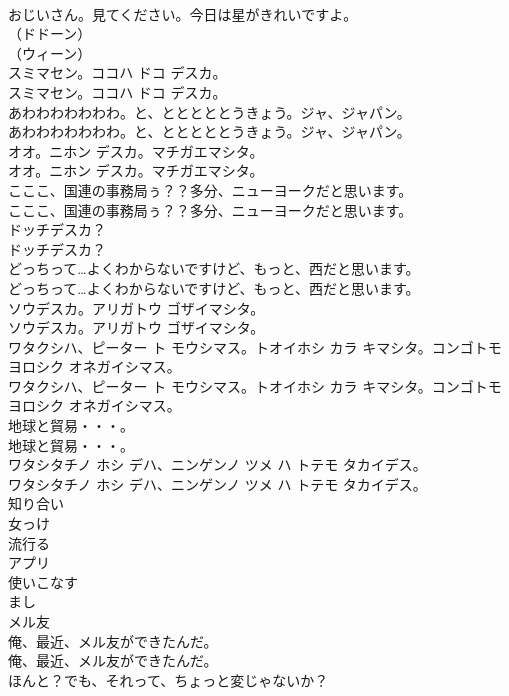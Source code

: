 \documentclass[8pt]{extreport}
\begin{document}
\begin{CJK}{UTF8}{min}
\\	おじいさん。見てください。今日は星がきれいですよ。 
\\	（ドドーン）	
\\	（ウィーン）	
\\	スミマセン。ココハ ドコ デスカ。	
\\	スミマセン。ココハ ドコ デスカ。 
\\	あわわわわわわわ。と、とととととうきょう。ジャ、ジャパン。	
\\	あわわわわわわわ。と、とととととうきょう。ジャ、ジャパン。 
\\	オオ。ニホン デスカ。マチガエマシタ。	
\\	オオ。ニホン デスカ。マチガエマシタ。 
\\	こここ、国連の事務局ぅ？？多分、ニューヨークだと思います。	
\\	こここ、国連の事務局ぅ？？多分、ニューヨークだと思います。 
\\	ドッチデスカ？	
\\	ドッチデスカ？ 
\\	どっちって…よくわからないですけど、もっと、西だと思います。	
\\	どっちって…よくわからないですけど、もっと、西だと思います。 
\\	ソウデスカ。アリガトウ ゴザイマシタ。	
\\	ソウデスカ。アリガトウ ゴザイマシタ。 
\\	ワタクシハ、ピーター ト モウシマス。トオイホシ カラ キマシタ。コンゴトモ　ヨロシク オネガイシマス。	
\\	ワタクシハ、ピーター ト モウシマス。トオイホシ カラ キマシタ。コンゴトモ　ヨロシク オネガイシマス。 
\\	地球と貿易・・・。	
\\	地球と貿易・・・。 
\\	ワタシタチノ ホシ デハ、ニンゲンノ ツメ ハ トテモ タカイデス。	
\\	ワタシタチノ ホシ デハ、ニンゲンノ ツメ ハ トテモ タカイデス。 
\\	知り合い
\\	女っけ
\\	流行る
\\	アプリ
\\	使いこなす
\\	まし
\\	メル友
\\	俺、最近、メル友ができたんだ。	
\\	俺、最近、メル友ができたんだ。 
\\	ほんと？でも、それって、ちょっと変じゃないか？	

\end{CJK}
\end{document}
